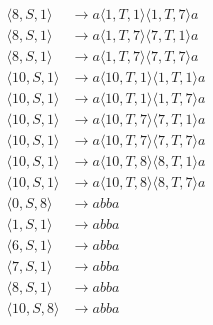 \documentclass[12pt,a4paper]{article}
\begin{document}
\[\begin{aligned}
\langle8,S,1\rangle&\to a\langle1,T,1\rangle\langle1,T,7\rangle a\\
\langle8,S,1\rangle&\to a\langle1,T,7\rangle\langle7,T,1\rangle a\\
\langle8,S,1\rangle&\to a\langle1,T,7\rangle\langle7,T,7\rangle a\\
\langle10,S,1\rangle&\to a\langle10,T,1\rangle\langle1,T,1\rangle a\\
\langle10,S,1\rangle&\to a\langle10,T,1\rangle\langle1,T,7\rangle a\\
\langle10,S,1\rangle&\to a\langle10,T,7\rangle\langle7,T,1\rangle a\\
\langle10,S,1\rangle&\to a\langle10,T,7\rangle\langle7,T,7\rangle a\\
\langle10,S,1\rangle&\to a\langle10,T,8\rangle\langle8,T,1\rangle a\\
\langle10,S,1\rangle&\to a\langle10,T,8\rangle\langle8,T,7\rangle a\\
\langle0,S,8\rangle&\to abba\\
\langle1,S,1\rangle&\to abba\\
\langle6,S,1\rangle&\to abba\\
\langle7,S,1\rangle&\to abba\\
\langle8,S,1\rangle&\to abba\\
\langle10,S,8\rangle&\to abba
\end{aligned}
\]
\end{document}

